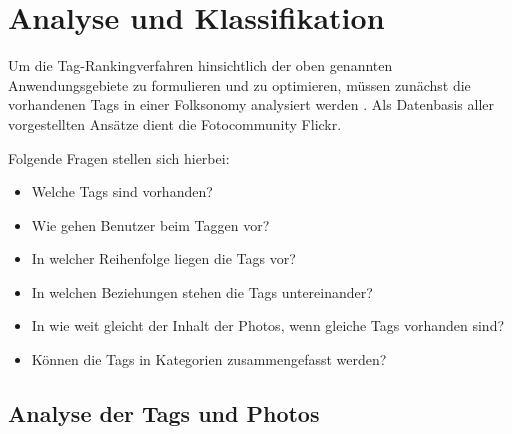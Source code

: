 \section{Analyse und Klassifikation} %
\label{sec:analyse_und_klassifikation}

Um die Tag-Rankingverfahren hinsichtlich der oben genannten Anwendungsgebiete zu formulieren und zu optimieren, müssen zunächst die vorhandenen Tags in einer Folksonomy analysiert werden \cite{collectiveKnowledge}. Als Datenbasis aller vorgestellten Ansätze dient die Fotocommunity Flickr.


Folgende Fragen stellen sich hierbei:
\begin{itemize}
	\item     Welche Tags sind vorhanden?
	\item     Wie gehen Benutzer beim Taggen vor?
	\item     In welcher Reihenfolge liegen die Tags vor?
	\item     In welchen Beziehungen stehen die Tags untereinander?
	\item     In wie weit gleicht der Inhalt der Photos, wenn gleiche Tags vorhanden sind?
	\item     Können die Tags in Kategorien zusammengefasst werden?
\end{itemize}


\subsection{Analyse der Tags und Photos} %
\label{sub:analyse_der_tags}

